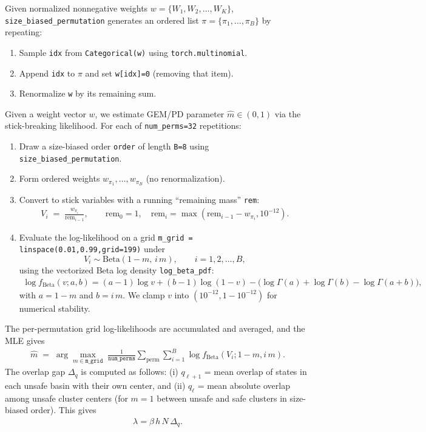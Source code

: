 \documentclass{article}
\theoremstyle{remark} %
\begin{document}
Given normalized nonnegative weights $w=\{W_1,W_2,\dots,W_K\}$, \texttt{size\_biased\_permutation} generates an ordered list
$\pi=\{\pi_1,\dots,\pi_B\}$ by repeating:
\begin{enumerate}
\item Sample \texttt{idx} from \texttt{Categorical(w)} using \texttt{torch.multinomial}.
\item Append \texttt{idx} to $\pi$ and set \texttt{w[idx]=0} (removing that item).
\item Renormalize \texttt{w} by its remaining sum.
\end{enumerate}


Given a weight vector $w$, we estimate GEM/PD parameter $\hat m\in(0,1)$
via the  stick-breaking likelihood. For each of \texttt{num\_perms=32} repetitions:
\begin{enumerate}
\item Draw a size-biased order \texttt{order} of length \texttt{B=8} using \texttt{size\_biased\_permutation}.
\item Form ordered weights $w_{\pi_1},\dots,w_{\pi_{B}}$ (no renormalization).
\item Convert to stick variables with a running ``remaining mass'' \texttt{rem}:
\begin{align}
V_i \;=\; \frac{w_{\pi_i}}{\mathrm{rem}_{i-1}},\qquad \mathrm{rem}_0=1,\quad \mathrm{rem}_i=\max(\mathrm{rem}_{i-1}-w_{\pi_i},10^{-12}).
\end{align}
\item Evaluate the log-likelihood on a grid \texttt{m\_grid = linspace(0.01,0.99,grid=199)} under
\begin{equation}
V_i \sim \mathrm{Beta}(1-m,\, i\,m),\qquad i=1,2,\dots,B,
\end{equation}
using the vectorized Beta log density \texttt{log\_beta\_pdf}:
\begin{align}
\log f_{\mathrm{Beta}}(v;a,b)=(a-1)\log v+(b-1)\log(1-v)-\big(\log\Gamma(a)+\log\Gamma(b)-\log\Gamma(a+b)\big),
\end{align}
with $a=1-m$ and $b=i\,m$. We clamp $v$ into $(10^{-12},1-10^{-12})$ for numerical stability.
\end{enumerate}
The per-permutation grid log-likelihoods are accumulated and averaged, and the MLE gives
\begin{align}
\hat m \;=\; \arg\max_{m\in\texttt{m\_grid}} \;\frac{1}{\texttt{num\_perms}}\sum_{\text{perm}}\sum_{i=1}^{B}\log f_{\mathrm{Beta}}(V_i;1-m,i\,m).
\end{align}
The overlap gap $\Delta_q$ is computed as follows:
(i) $q_{\ell+1}$ = mean overlap of states in each unsafe basin with their own center, and
(ii) $q_\ell$ = mean absolute overlap among unsafe cluster centers (for $m=1$ between unsafe and safe clusters in size-biased order). This gives
\begin{align}
\lambda=\beta\,h\,N\,\Delta_q.
\end{align}
\end{document}
